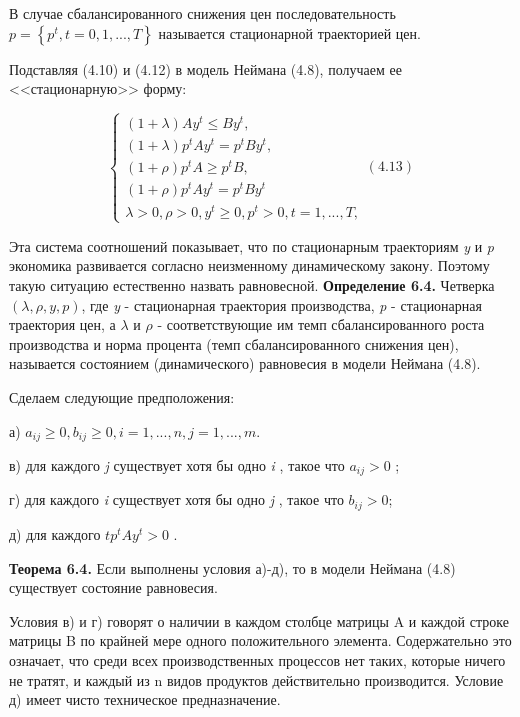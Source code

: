 \documentclass[12pt, 4paper]{book}
\begin{document}
{В случае сбалансированного снижения цен последовательность $p=\left\{p^t,t=0,1,...,T \right\}$ называется стационарной траекторией цен.
\par

Подставляя (4.10) и (4.12) в модель Неймана (4.8), получаем ее <<стационарную>> форму:
\begin{center}
$$\left\{
\begin{aligned}
(1+\lambda)A y^t \leq B y^{t},\\
(1+\lambda)p^tAy^t = p^t B y^{t},\\
(1+\rho)p^{t}A \geq p^t B,\\
(1+\rho)p^{t} A y^t = p^t B y^t \\
\lambda >0, \rho >0, y^t \geq 0,p^t >0, t=1,...,T,
\end{aligned} (4.13)
\right.$$ 
\end{center}
\par

Эта система соотношений показывает, что по стационарным траекториям \textit{y} и \textit{p} экономика развивается согласно неизменному динамическому закону. Поэтому такую ситуацию естественно назвать равновесной.
\textbf{Определение 6.4.} Четверка $(\lambda,\rho,y,p)$, где \textit{y} - стационарная траектория производства, \textit{p} - стационарная траектория цен, а $\lambda$ и $\rho$ - соответствующие им темп сбалансированного роста производства и норма процента (темп сбалансированного снижения цен), называется состоянием (динамического) равновесия в модели Неймана (4.8).
\par

Сделаем следующие предположения:
\par

а) $a_{ij} \geq 0, b_{ij} \geq 0, i=1,...,n ,j=1,...,m.$
\par

в) для каждого \textit{j} существует хотя бы одно \textit{i} , такое что $a_{ij} > 0$ ;
\par

г) для каждого \textit{i} существует хотя бы одно \textit{j} , такое что $b_{ij} >0$;
\par

д) для каждого $ \textit{t} p^t A y^t > 0$ .
\par

\textbf{Теорема 6.4.} Если выполнены условия а)-д), то в модели Неймана (4.8) существует состояние равновесия.
\par

Условия в) и г) говорят о наличии в каждом столбце матрицы A и каждой строке матрицы B по крайней мере одного положительного элемента. Содержательно это означает, что среди всех производственных процессов нет таких, которые ничего не тратят, и каждый из n видов продуктов действительно производится. Условие д) имеет чисто техническое предназначение.
\par

}
\end{document}
